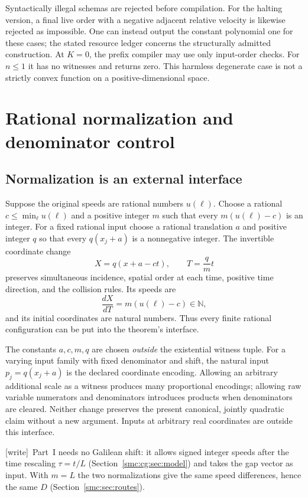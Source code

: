 \documentclass[11pt,letterpaper]{article}
\numberwithin{equation}{section}
\theoremstyle{definition}
\theoremstyle{remark}
\newcommand{\NN}{\mathbb N}
\newcommand{\wtag}{\textup{[write]}}
\begin{document}
Syntactically illegal schemas are rejected before compilation. For the halting version, a final live order with a negative adjacent relative velocity is likewise rejected as impossible. One can instead output the constant polynomial one for these cases; the stated resource ledger concerns the structurally admitted construction. At $K=0$, the prefix compiler may use only input-order checks. For $n\le1$ it has no witnesses and returns zero. This harmless degenerate case is not a strictly convex function on a positive-dimensional space.

\section{Rational normalization and denominator control}\label{smc:sd:sec:normalization}
\subsection{Normalization is an external interface}\label{smc:sd:sec:normalize}
Suppose the original speeds are rational numbers $u(\ell)$. Choose a rational $c\le\min_\ell u(\ell)$ and a positive integer $m$ such that every $m(u(\ell)-c)$ is an integer. For a fixed rational input choose a rational translation $a$ and positive integer $q$ so that every $q(x_j+a)$ is a nonnegative integer. The invertible coordinate change
\begin{equation}\label{smc:sd:eq:normalize}
 X=q(x+a-ct),\qquad T=\frac{q}{m}t
\end{equation}
preserves simultaneous incidence, spatial order at each time, positive time direction, and the collision rules. Its speeds are
\[
 \frac{dX}{dT}=m(u(\ell)-c)\in\NN,
\]
and its initial coordinates are natural numbers. Thus every finite rational configuration can be put into the theorem's interface.

The constants $a,c,m,q$ are chosen \emph{outside} the existential witness tuple. For a varying input family with fixed denominator and shift, the natural input $p_j=q(x_j+a)$ is the declared coordinate encoding. Allowing an arbitrary additional scale as a witness produces many proportional encodings; allowing raw variable numerators and denominators introduces products when denominators are cleared. Neither change preserves the present canonical, jointly quadratic claim without a new argument. Inputs at arbitrary real coordinates are outside this interface.


\wtag\ Part~I needs no Galilean shift: it allows signed integer speeds after the time rescaling $\tau=t/L$ (Section~\ref{smc:cg:sec:model}) and takes the gap vector as input. With $m=L$ the two normalizations give the same speed differences, hence the same $D$ (Section~\ref{smc:sec:routes}).
\end{document}
